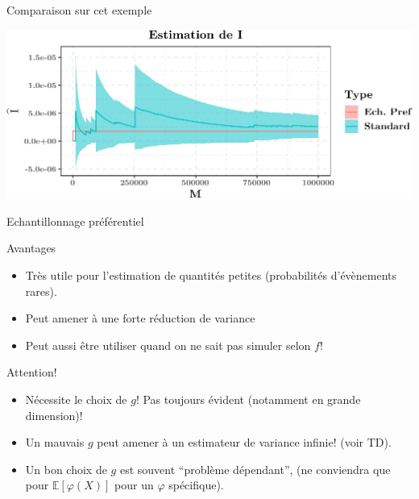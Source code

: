 \documentclass[ignorenonframetext,]{beamer}
\providecommand{\tightlist}{%
  \setlength{\itemsep}{0pt}\setlength{\parskip}{0pt}}
\newcommand{\E}{\mathbb{E}}
\begin{document}
\begin{frame}{Comparaison sur cet exemple}
\protect\hypertarget{comparaison-sur-cet-exemple}{}

\includegraphics{diapos_importance_sampling_files/figure-beamer/compare_is_mc-1.pdf}

\end{frame}

\begin{frame}{Echantillonnage préférentiel}
\protect\hypertarget{echantillonnage-pruxe9fuxe9rentiel-2}{}

\begin{block}{Avantages}

\begin{itemize}
\tightlist
\item
  Très utile pour l'estimation de quantités petites (probabilités
  d'évènements rares). \pause
\item
  Peut amener à une forte réduction de variance \pause
\item
  Peut aussi être utiliser quand on ne sait pas simuler selon \(f\)!
  \pause
\end{itemize}

\end{block}

\begin{block}{Attention!}

\begin{itemize}
\tightlist
\item
  Nécessite le choix de \(g\)! Pas toujours évident (notamment en grande
  dimension)!\pause
\item
  Un mauvais \(g\) peut amener à un estimateur de variance infinie!
  (voir TD).
\item
  Un bon choix de \(g\) est souvent ``problème dépendant'', (ne
  conviendra que pour \(\E[\varphi(X)]\) pour un \(\varphi\)
  spécifique).
\end{itemize}

\end{block}

\end{frame}
\end{document}
